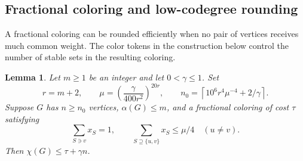 \documentclass[11pt]{article}
\newtheorem{lemma}[theorem]{Lemma}
\begin{document}
\subsection{Fractional coloring and low-codegree rounding}

A fractional coloring can be rounded efficiently when no pair of vertices receives much
 common weight. The color tokens in the construction below control the number of stable
 sets in the resulting coloring.

\begin{lemma}\label{lem:rounding}
Let $m\ge1$ be an integer and let $0<\gamma\le1$. Set
\[
 r=m+2,\qquad
 \mu=\left(\frac{\gamma}{400r^2}\right)^{20r},\qquad
 n_0=\left\lceil10^6r^4\mu^{-4}+2/\gamma\right\rceil.
\]
Suppose $G$ has $n\ge n_0$ vertices, $\alpha(G)\le m$, and a fractional coloring of cost
 $\tau$ satisfying
\[
 \sum_{S\ni v}x_S=1,\qquad
 \sum_{S\supseteq\{u,v\}}x_S\le\mu/4\quad(u\ne v).
\]
Then $\chi(G)\le\tau+\gamma n$.
\end{lemma}
\end{document}
